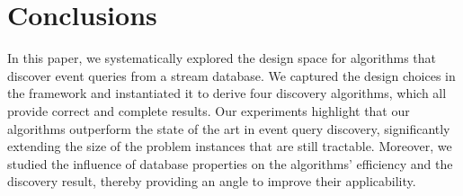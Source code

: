\section{Conclusions}
\label{sec:conclusions}
In this paper, we systematically explored the design space
for algorithms that discover event queries from a stream database. We
captured the design choices in the \sys{} framework and instantiated it to
derive four discovery algorithms, which all
provide correct and complete results. Our experiments highlight
that our algorithms outperform the state of the art in event query
discovery, significantly extending the size of the problem instances that
are still tractable. Moreover, we studied the influence of database
properties on the algorithms' efficiency and the discovery result, thereby
providing an angle to improve their applicability.
